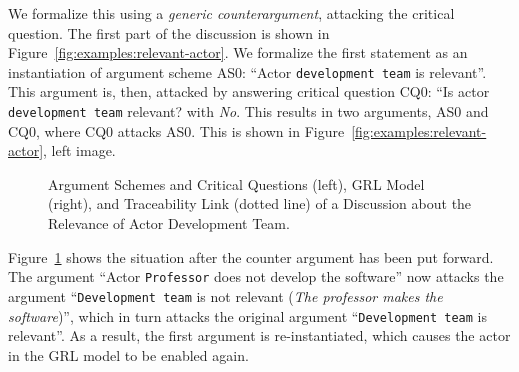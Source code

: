 We formalize this using a \emph{generic counterargument}, attacking the critical question. The first part of the discussion is shown in Figure~\ref{fig:examples:relevant-actor}. We formalize the first statement as an instantiation of argument scheme AS0: ``Actor \texttt{development team} is relevant''. This argument is, then, attacked by answering critical question CQ0: ``Is actor \texttt{development team} relevant? with \emph{No}. This results in two arguments, AS0 and CQ0, where CQ0 attacks AS0. This is shown in Figure~\ref{fig:examples:relevant-actor}, left image.

\begin{figure}[ht!]
\centering
\caption{Argument Schemes and Critical Questions (left), GRL Model (right), and Traceability Link (dotted line) of a Discussion about the Relevance of Actor Development Team.}
\label{fig:examples:relevant-actor2}
\end{figure}

Figure~\ref{fig:examples:relevant-actor2} shows the situation after the counter argument has been put forward. The argument ``Actor \texttt{Professor} does not develop the software'' now attacks the argument ``\texttt{Development team} is not relevant (\emph{The professor makes the software})'', which in turn attacks the original argument ``\texttt{Development team} is relevant''. As a result, the first argument is re-instantiated, which causes the actor in the GRL model to be enabled again.